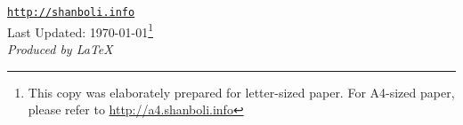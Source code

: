 \vfill
\begin{figure}[h]
\hspace{1.54in}
\end{figure}
\begin{narrow}{0.15in}{1.5in}
\begin{center}
\href{http://shanboli.info}{\tt http://shanboli.info}\\
\vspace{0.15in}
Last Updated: \today\footnote{This copy was elaborately prepared for letter-sized paper. For A4-sized paper, please refer to \href{http://a4.shanboli.info}
{http://a4.shanboli.info}}\\
\vspace{0.15in}
\textit{Produced by \LaTeX}
\end{center}
\end{narrow}
